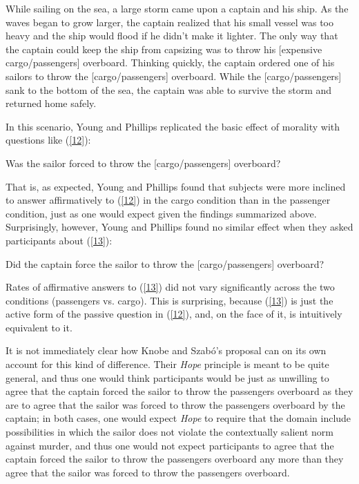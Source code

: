 \documentclass{salt}
\newcommand{\reff}[1]{(\ref{#1})}
\begin{document}
\begin{exe}\ex While sailing on the sea, a large storm came upon a captain and his ship. As the waves began to grow larger, the captain realized that his small vessel was too heavy and the ship would flood if he didn't make it lighter. The only way that the captain could keep the ship from capsizing was to throw his [expensive cargo/passengers] overboard. Thinking quickly, the captain ordered one of his sailors to throw the [cargo/passengers] overboard. While the [cargo/passengers] sank to the bottom of the sea, the captain was able to survive the storm and returned home safely. \label{youngScenario}\end{exe}


\noindent In this scenario, Young and Phillips replicated the basic effect of morality with questions like \reff{12}:

\begin{exe}\ex \label{12} Was the sailor forced to throw the [cargo/passengers] overboard?\end{exe}

\noindent That is, as expected, Young and Phillips found that subjects were more inclined to answer affirmatively to \reff{12} in the cargo condition than in the passenger condition, just as one would expect given the findings summarized above. Surprisingly, however, Young and Phillips found no similar effect when they asked participants about \reff{13}: 

\begin{exe}\ex \label{13} Did the captain force the sailor to throw the [cargo/passengers] overboard?\end{exe}

\noindent Rates of affirmative answers to \reff{13} did not vary significantly across the two conditions (passengers vs. cargo). This is surprising, because \reff{13} is just the active form of the passive question in \reff{12}, and, on the face of it, is intuitively equivalent to it. 

It is not immediately clear how Knobe and Szab{\'o}'s proposal can on its own account for this kind of difference. Their \emph{Hope} principle is meant to be quite general, and thus one would think participants would be just as unwilling to agree that the captain forced the sailor to throw the passengers overboard as they are to agree that the sailor was forced to throw the passengers overboard by the captain; in both cases, one would expect \emph{Hope} to require that the domain include possibilities in which the sailor does not violate the contextually salient norm against murder, and thus one would not expect participants to agree that the captain forced the sailor to throw the passengers overboard any more than they agree that the sailor was forced to throw the passengers overboard. 
\end{document}
